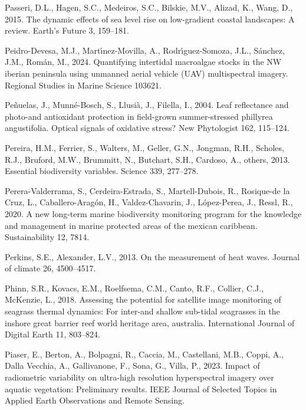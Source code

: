 \documentclass[
  letterpaper,
  11pt,
  english,
  singlespacing,
  headsepline]{MastersDoctoralThesis}
\newlength{\cslhangindent}
\newenvironment{CSLReferences}[2] %
 {\begin{list}{}{%
  \setlength{\itemindent}{0pt}
  \setlength{\leftmargin}{0pt}
  \setlength{\parsep}{0pt}
  \ifodd #1
   \setlength{\leftmargin}{\cslhangindent}
   \setlength{\itemindent}{-1\cslhangindent}
  \fi
  \setlength{\itemsep}{#2\baselineskip}}}
 {\end{list}}
\begin{document}
\begin{CSLReferences}{1}{0}
Passeri, D.L., Hagen, S.C., Medeiros, S.C., Bilskie, M.V., Alizad, K.,
Wang, D., 2015. The dynamic effects of sea level rise on low-gradient
coastal landscapes: A review. Earth's Future 3, 159--181.

Peidro-Devesa, M.J., Martı́nez-Movilla, A., Rodrı́guez-Somoza, J.L.,
Sánchez, J.M., Román, M., 2024. Quantifying intertidal macroalgae stocks
in the NW iberian peninsula using unmanned aerial vehicle (UAV)
multispectral imagery. Regional Studies in Marine Science 103621.

Peñuelas, J., Munné-Bosch, S., Llusià, J., Filella, I., 2004. Leaf
reflectance and photo-and antioxidant protection in field-grown
summer-stressed phillyrea angustifolia. Optical signals of oxidative
stress? New Phytologist 162, 115--124.

Pereira, H.M., Ferrier, S., Walters, M., Geller, G.N., Jongman, R.H.,
Scholes, R.J., Bruford, M.W., Brummitt, N., Butchart, S.H., Cardoso, A.,
others, 2013. Essential biodiversity variables. Science 339, 277--278.

Perera-Valderrama, S., Cerdeira-Estrada, S., Martell-Dubois, R.,
Rosique-de la Cruz, L., Caballero-Aragón, H., Valdez-Chavarin, J.,
López-Perea, J., Ressl, R., 2020. A new long-term marine biodiversity
monitoring program for the knowledge and management in marine protected
areas of the mexican caribbean. Sustainability 12, 7814.

Perkins, S.E., Alexander, L.V., 2013. On the measurement of heat waves.
Journal of climate 26, 4500--4517.

Phinn, S.R., Kovacs, E.M., Roelfsema, C.M., Canto, R.F., Collier, C.J.,
McKenzie, L., 2018. Assessing the potential for satellite image
monitoring of seagrass thermal dynamics: For inter-and shallow sub-tidal
seagrasses in the inshore great barrier reef world heritage area,
australia. International Journal of Digital Earth 11, 803--824.

Piaser, E., Berton, A., Bolpagni, R., Caccia, M., Castellani, M.B.,
Coppi, A., Dalla Vecchia, A., Gallivanone, F., Sona, G., Villa, P.,
2023. Impact of radiometric variability on ultra-high resolution
hyperspectral imagery over aquatic vegetation: Preliminary results. IEEE
Journal of Selected Topics in Applied Earth Observations and Remote
Sensing.


\end{CSLReferences}
\end{document}

